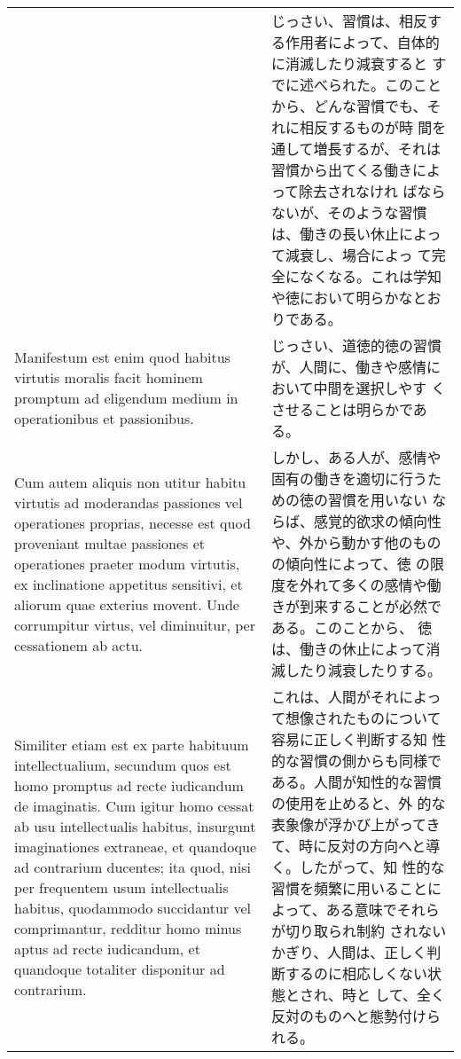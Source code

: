 \documentclass[10pt]{jsarticle} %
\begin{document}
\begin{longtable}{p{21em}p{21em}}
&

じっさい、習慣は、相反する作用者によって、自体的に消滅したり減衰すると
すでに述べられた。このことから、どんな習慣でも、それに相反するものが時
間を通して増長するが、それは習慣から出てくる働きによって除去されなけれ
ばならないが、そのような習慣は、働きの長い休止によって減衰し、場合によっ
て完全になくなる。これは学知や徳において明らかなとおりである。

\\


Manifestum est enim quod habitus virtutis moralis facit hominem
promptum ad eligendum medium in operationibus et passionibus.


&

じっさい、道徳的徳の習慣が、人間に、働きや感情において中間を選択しやす
くさせることは明らかである。


\\


Cum autem aliquis non utitur habitu virtutis ad moderandas passiones
vel operationes proprias, necesse est quod proveniant multae passiones
et operationes praeter modum virtutis, ex inclinatione appetitus
sensitivi, et aliorum quae exterius movent. Unde corrumpitur virtus,
vel diminuitur, per cessationem ab actu.


&

しかし、ある人が、感情や固有の働きを適切に行うための徳の習慣を用いない
ならば、感覚的欲求の傾向性や、外から動かす他のものの傾向性によって、徳
の限度を外れて多くの感情や働きが到来することが必然である。このことから、
徳は、働きの休止によって消滅したり減衰したりする。

\\

Similiter etiam est ex parte habituum intellectualium, secundum quos
est homo promptus ad recte iudicandum de imaginatis.  Cum igitur homo
cessat ab usu intellectualis habitus, insurgunt imaginationes
extraneae, et quandoque ad contrarium ducentes; ita quod, nisi per
frequentem usum intellectualis habitus, quodammodo succidantur vel
comprimantur, redditur homo minus aptus ad recte iudicandum, et
quandoque totaliter disponitur ad contrarium.


&

これは、人間がそれによって想像されたものについて容易に正しく判断する知
性的な習慣の側からも同様である。人間が知性的な習慣の使用を止めると、外
的な表象像が浮かび上がってきて、時に反対の方向へと導く。したがって、知
性的な習慣を頻繁に用いることによって、ある意味でそれらが切り取られ制約
されないかぎり、人間は、正しく判断するのに相応しくない状態とされ、時と
して、全く反対のものへと態勢付けられる。


\end{longtable}
\end{document}
